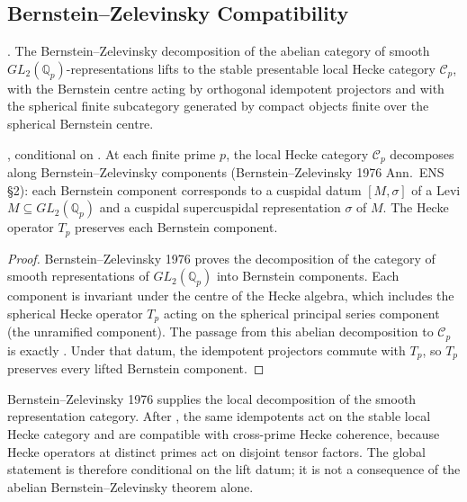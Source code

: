 \subsection{Bernstein--Zelevinsky Compatibility}

\begin{conjecture}
\label{v4-arith:lacd:conj:BZ-infty-lift}
\ClaimStatusConjectured. The Bernstein--Zelevinsky decomposition of the
abelian category of smooth \(GL_{2}(\mathbb{Q}_{p})\)-representations
lifts to the stable presentable local Hecke category
\(\mathcal C_p\), with the Bernstein centre acting by orthogonal
idempotent projectors and with the spherical finite subcategory
generated by compact objects finite over the spherical Bernstein
centre.
\end{conjecture}

\begin{proposition}
\label{v4-arith:lacd:prop:BZ-compat}
\ClaimStatusProvedHereConditional, conditional on
. At each finite prime \(p\), the local Hecke
category \(\mathcal{C}_{p}\) decomposes along Bernstein--Zelevinsky
components (Bernstein--Zelevinsky 1976 Ann.\ ENS \S2): each
Bernstein component corresponds to a cuspidal datum
\([M, \sigma]\) of a Levi \(M \subseteq GL_{2}(\mathbb{Q}_{p})\) and
a cuspidal supercuspidal representation \(\sigma\) of \(M\). The Hecke
operator \(T_{p}\) preserves each Bernstein component.
\end{proposition}

\begin{proof}
Bernstein--Zelevinsky 1976 proves the decomposition of the category
of smooth representations of \(GL_{2}(\mathbb{Q}_{p})\) into
Bernstein components. Each component is invariant under the
centre of the Hecke algebra, which includes the spherical Hecke
operator \(T_{p}\) acting on the spherical principal series
component (the unramified component). The passage from this abelian
decomposition to \(\mathcal C_p\) is exactly
. Under that datum, the
idempotent projectors commute with \(T_p\), so \(T_p\) preserves every
lifted Bernstein component.
\end{proof}

\begin{remark}
\label{v4-arith:lacd:rem:BZ-role}
Bernstein--Zelevinsky 1976 supplies the local decomposition of the
smooth representation category. After
, the same idempotents act on
the stable local Hecke category and are compatible with cross-prime
Hecke coherence, because Hecke operators at distinct primes act on
disjoint tensor factors. The global statement is therefore conditional
on the lift datum; it is not a consequence of the abelian
Bernstein--Zelevinsky theorem alone.
\end{remark}

